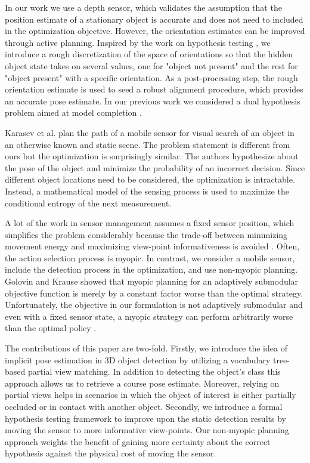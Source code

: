 In our work we use a depth sensor, which validates the assumption that the position estimate of a stationary object is accurate and does not need to included in the optimization objective. However, the orientation estimates can be improved through active planning. Inspired by the work on hypothesis testing \cite{Javidi12_arxiv}, we introduce a rough discretization of the space of orientations so that the hidden object state takes on several values, one for "object not present" and the rest for "object present" with a specific orientation. As a post-processing step, the rough orientation estimate is used to seed a robust alignment procedure, which provides an accurate pose estimate. In our previous work we considered a dual hypothesis problem aimed at model completion \cite{BharathThesis}. 

Karasev et al. \cite{karasev12_visual_learning} plan the path of a mobile sensor for visual search of an object in an otherwise known and static scene. The problem statement is different from ours but the optimization is surprisingly similar. The authors hypothesize about the pose of the object and minimize the probability of an incorrect decision. Since different object locations need to be considered, the optimization is intractable. Instead, a mathematical model of the sensing process is used to maximize the conditional entropy of the next measurement. 
 
A lot of the work in sensor management assumes a fixed sensor position, which simplifies the problem considerably because the trade-off between minimizing movement energy and maximizing view-point informativeness is avoided \cite{sommerlade08_information, Kragic06_ActiveObjRecognition}. Often, the action selection process is myopic. In contrast, we consider a mobile sensor, include the detection process in the optimization, and use non-myopic planning. Golovin and Krause \cite{golovin11_adaptive} showed that myopic planning for an adaptively submodular objective function is merely by a constant factor worse than the optimal strategy. Unfortunately, the objective in our formulation is not adaptively submodular and even with a fixed sensor state, a myopic strategy can perform arbitrarily worse than the optimal policy \cite{Javidi12_arxiv}.

The contributions of this paper are two-fold. Firstly, we introduce the idea of implicit pose estimation in 3D object detection by utilizing a vocabulary tree-based partial view matching. In addition to detecting the object's class this approach allows us to retrieve a course pose estimate. Moreover, relying on partial views helps in scenarios in which the object of interest is either partially occluded or in contact with another object. Secondly, we introduce a formal hypothesis testing framework to improve upon the static detection results by moving the sensor to more informative view-points. Our non-myopic planning approach weights the benefit of gaining more certainty about the correct hypothesis against the physical cost of moving the sensor. 




